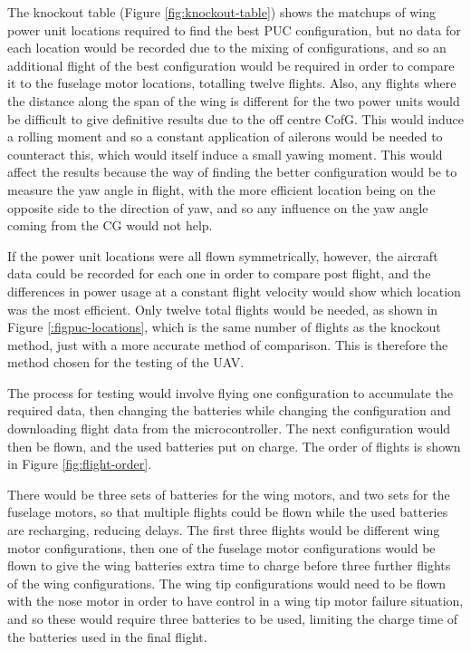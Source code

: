 \documentclass[../../main.tex]{subfiles}
\begin{document}

The knockout table (Figure \ref{fig:knockout-table}) shows the matchups of wing power unit locations required to find the best PUC configuration, but no data for each location would be recorded due to the mixing of configurations, and so an additional flight of the best configuration would be required in order to compare it to the fuselage motor locations, totalling twelve flights.
Also, any flights where the distance along the span of the wing is different for the two power units would be difficult to give definitive results due to the off centre CofG.
This would induce a rolling moment and so a constant application of ailerons would be needed to counteract this, which would itself induce a small yawing moment.
This would affect the results because the way of finding the better configuration would be to measure the yaw angle in flight, with the more efficient location being on the opposite side to the direction of yaw, and so any influence on the yaw angle coming from the CG would not help. 

If the power unit locations were all flown symmetrically, however, the aircraft data could be recorded for each one in order to compare post flight, and the differences in power usage at a constant flight velocity would show which location was the most efficient.
Only twelve total flights would be needed, as shown in Figure \ref{:figpuc-locations}, which is the same number of flights as the knockout method, just with a more accurate method of comparison.
This is therefore the method chosen for the testing of the UAV.

The process for testing would involve flying one configuration to accumulate the required data, then changing the batteries while changing the configuration and downloading flight data from the microcontroller.
The next configuration would then be flown, and the used batteries put on charge.
The order of flights is shown in Figure \ref{fig:flight-order}. 


There would be three sets of batteries for the wing motors, and two sets for the fuselage motors, so that multiple flights could be flown while the used batteries are recharging, reducing delays.
The first three flights would be different wing motor configurations, then one of the fuselage motor configurations would be flown to give the wing batteries extra time to charge before three further flights of the wing configurations.
The wing tip configurations would need to be flown with the nose motor in order to have control in a wing tip motor failure situation, and so these would require three batteries to be used, limiting the charge time of the batteries used in the final flight.
\end{document}
